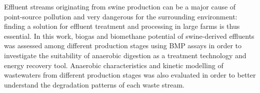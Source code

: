 Effluent streams originating from swine production can be a major cause of point-source pollution and very dangerous for the surrounding environment: finding a solution for effluent treatment and processing in large farms is thus essential. In this work, biogas and biomethane potential of swine-derived effluents was assessed among different production stages using BMP assays in order to investigate the suitability of anaerobic digestion as a treatment technology and energy recovery tool. Anaerobic characteristics and kinetic modelling of wastewaters from different production stages was also evaluated in order to better understand the degradation patterns of each waste stream.